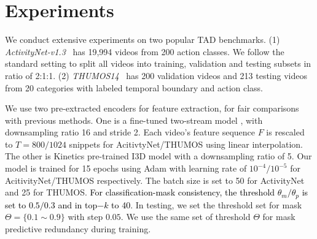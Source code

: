 \documentclass[runningheads]{llncs}
\begin{document}
\section{Experiments}
\label{sec:exp}
We conduct extensive experiments on two popular TAD benchmarks.
(1) \textit{ActivityNet-v1.3}~\cite{caba2015activitynet} has 19,994 videos from 200 action classes. We follow the standard setting to split all videos into training, validation and testing subsets 
in ratio of 2:1:1.
(2) \textit{THUMOS14}~\cite{idrees2017thumos} has 200 validation videos and 213 testing videos from 20 categories with labeled temporal boundary and action class. 


We use two pre-extracted encoders for feature extraction, for fair comparisons with previous methods. 
One is a fine-tuned two-stream model \cite{lin2019bmn}, with downsampling ratio 16 and stride 2. Each video's feature sequence $F$ is rescaled to $T = 800/1024$ snippets for AcitivtyNet/THUMOS using linear interpolation. The other is Kinetics pre-trained I3D model \cite{carreira2017quo} with a downsampling ratio of 5. 
Our model is trained for 15 epochs using Adam with learning rate of {$10^{-4}/10^{-5}$ for AcitivityNet/THUMOS respectively. The batch size is set to 50 for ActivityNet and 25 for THUMOS}. 
\textcolor{black}{For classification-mask consistency, the threshold $\theta_{m}/\theta_{p}$ is set to $0.5/0.3$ and in top$-k$ to 40}. In testing, 
we set the threshold set for mask $\Theta=\{0.1\sim 0.9\}$ with step $0.05$. We use the same set of threshold $\Theta$ for mask predictive redundancy during training.
\end{document}
